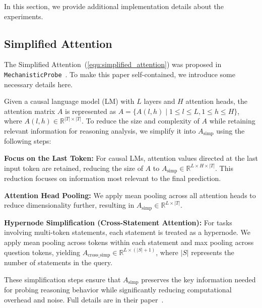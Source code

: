 In this section, we provide additional implementation details about the experiments.

\subsection{Simplified Attention}
\label{subsection: appendix-simplified_attention}
The Simplified Attention~(\ref{equ:simplified_attention}) was proposed in \texttt{MechanisticProbe}~\citep{hou2023towards}. To make this paper self-contained, we introduce some necessary details here.

Given a causal language model (LM) with $L$ layers and $H$ attention heads, the attention matrix \( A \) is represented as \( A = \{A(l, h) \mid 1 \leq l \leq L, 1 \leq h \leq H\} \), where \( A(l, h) \in \mathbb{R}^{|T| \times |T|} \). To reduce the size and complexity of \( A \) while retaining relevant information for reasoning analysis, we simplify it into \( A_{\text{simp}} \) using the following steps:

\textbf{Focus on the Last Token:} For causal LMs, attention values directed at the last input token are retained, reducing the size of \( A \) to \( A_{\text{simp}} \in \mathbb{R}^{L \times H \times |T|} \). This reduction focuses on information most relevant to the final prediction.

\textbf{Attention Head Pooling:} We apply mean pooling across all attention heads to reduce dimensionality further, resulting in \( A_{\text{simp}} \in \mathbb{R}^{L \times |T|} \).

\textbf{Hypernode Simplification (Cross-Statement Attention):} For tasks involving multi-token statements, each statement is treated as a hypernode. We apply mean pooling across tokens within each statement and max pooling across question tokens, yielding \( A_{\text{cross\_simp}} \in \mathbb{R}^{L \times (|S| + 1)} \), where \( |S| \) represents the number of statements in the query.

These simplification steps ensure that \( A_{\text{simp}} \) preserves the key information needed for probing reasoning behavior while significantly reducing computational overhead and noise. Full details are in their paper~\citep{hou2023towards}.



